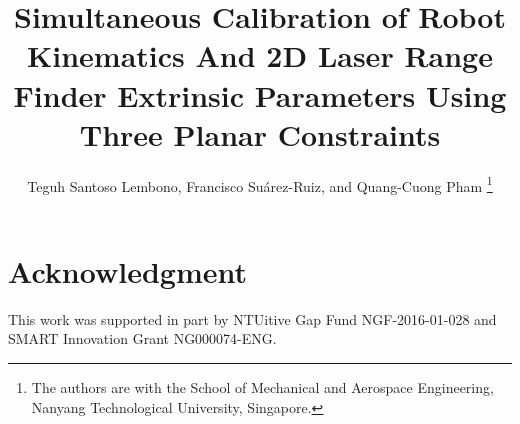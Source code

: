 \documentclass[letterpaper, 10 pt, conference]{ieeeconf}
\title{\LARGE
  \textbf{Simultaneous Calibration of Robot Kinematics And 2D Laser Range Finder Extrinsic Parameters Using Three Planar Constraints}}
\author{Teguh Santoso Lembono, Francisco Su\'{a}rez-Ruiz, and Quang-Cuong Pham%
  \thanks{The authors are with the School of Mechanical and Aerospace
          Engineering, Nanyang Technological University, Singapore.}}
\begin{document}
\maketitle
\thispagestyle{empty}
\pagestyle{empty}








\section*{Acknowledgment}
This work was supported in part by NTUitive Gap Fund NGF-2016-01-028
and SMART Innovation Grant NG000074-ENG.




\end{document}
